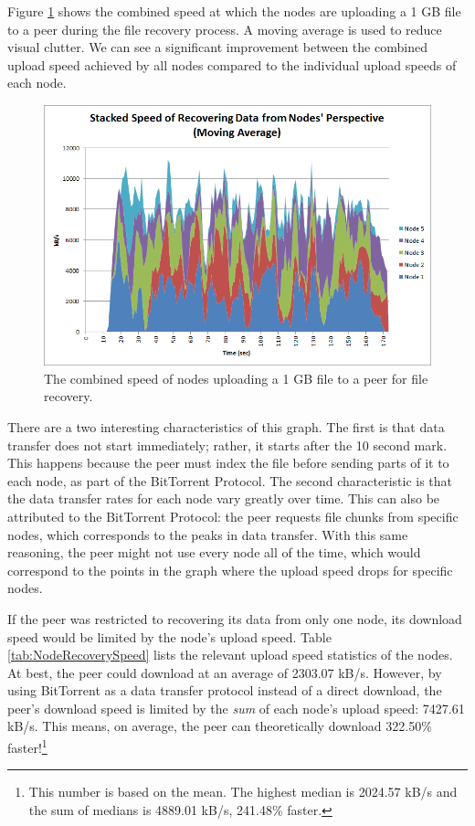 \documentclass[12pt]{report}
\begin{document}
Figure \ref{fig:NodeRecoverySpeed} shows the combined speed at which the nodes are uploading a 1 GB file to a peer during the file recovery process. A moving average is used to reduce visual clutter. We can see a significant improvement between the combined upload speed achieved by all nodes compared to the individual upload speeds of each node.

\begin{figure}
  \centerline{\includegraphics[scale=1]{figures/NodeRecoverySpeed}}
  \caption{The combined speed of nodes uploading a 1 GB file to a peer for file recovery.
  \label{fig:NodeRecoverySpeed}}
\end{figure}

There are a two interesting characteristics of this graph. The first is that data transfer does not start immediately; rather, it starts after the 10 second mark. This happens because the peer must index the file before sending parts of it to each node, as part of the BitTorrent Protocol. The second characteristic is that the data transfer rates for each node vary greatly over time. This can also be attributed to the BitTorrent Protocol: the peer requests file chunks from specific nodes, which corresponds to the peaks in data transfer. With this same reasoning, the peer might not use every node all of the time, which would correspond to the points in the graph where the upload speed drops for specific nodes.

If the peer was restricted to recovering its data from only one node, its download speed would be limited by the node's upload speed. Table \ref{tab:NodeRecoverySpeed} lists the relevant upload speed statistics of the nodes. At best, the peer could download at an average of 2303.07 kB/s. However, by using BitTorrent as a data transfer protocol instead of a direct download, the peer's download speed is limited by the \textit{sum} of each node's upload speed: 7427.61 kB/s. This means, on average, the peer can theoretically download 322.50\% faster!\footnote{This number is based on the mean. The highest median is 2024.57 kB/s and the sum of medians is 4889.01 kB/s, 241.48\% faster.}
\end{document}
